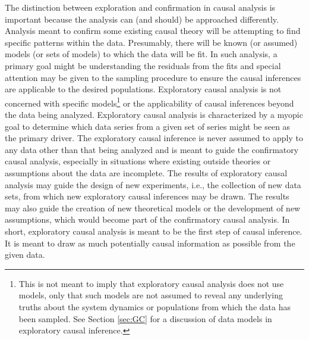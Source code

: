 The distinction between exploration and confirmation in causal analysis is important because the analysis can (and should) be approached differently.  Analysis meant to confirm some existing causal theory will be attempting to find specific patterns within the data.  Presumably, there will be known (or assumed) models (or sets of models) to which the data will be fit.  In such analysis, a primary goal might be understanding the residuals from the fits and special attention may be given to the sampling procedure to ensure the causal inferences are applicable to the desired populations.  Exploratory causal analysis is not concerned with specific models\footnote{This is not meant to imply that exploratory causal analysis does not use models, only that such models are not assumed to reveal any underlying truths about the system dynamics or populations from which the data has been sampled.  See Section \ref{sec:GC} for a discussion of data models in exploratory causal inference.} or the applicability of causal inferences beyond the data being analyzed.  Exploratory causal analysis is characterized by a myopic goal to determine which data series from a given set of series might be seen as the primary driver.  The exploratory causal inference is never assumed to apply to any data other than that being analyzed and is meant to guide the confirmatory causal analysis, especially in situations where existing outside theories or assumptions about the data are incomplete.  The results of exploratory causal analysis may guide the design of new experiments, i.e., the collection of new data sets, from which new exploratory causal inferences may be drawn.  The results may also guide the creation of new theoretical models or the development of new assumptions, which would become part of the confirmatory causal analysis.  In short, exploratory causal analysis is meant to be the first step of causal inference.  It is meant to draw as much potentially causal information as possible from the given data.

